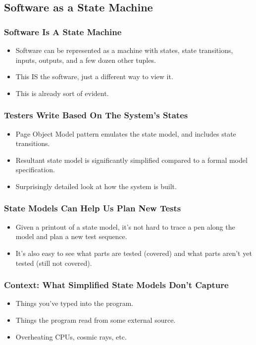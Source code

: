 \subsection{Software as a State Machine}
\begin{frame}
  \frametitle{Software Is A State Machine}
  \begin{itemize}
    \item Software can be represented as a machine with states, state transitions, inputs, outputs, and a few dozen other tuples.
    \item This IS the software, just a different way to view it.
    \item This is already sort of evident.
  \end{itemize}
\end{frame}

\begin{frame}
  \frametitle{Testers Write Based On The System's States}
  \begin{itemize}
    \item Page Object Model pattern emulates the state model, and includes state transitions.
    \item Resultant state model is significantly simplified compared to a formal model specification.
    \item Surprisingly detailed look at how the system is built.
  \end{itemize}
\end{frame}

\begin{frame}
  \frametitle{State Models Can Help Us Plan New Tests}
  \begin{itemize}
    \item Given a printout of a state model, it's not hard to trace a pen along the model and plan a new test sequence.
    \item It's also easy to see what parts are tested (covered) and what parts aren't yet tested (still not covered).
  \end{itemize}
\end{frame}

\begin{frame}
  \frametitle{Context: What Simplified State Models Don't Capture}
  \begin{itemize}
    \item Things you've typed into the program.
    \item Things the program read from some external source.
    \item Overheating CPUs, cosmic rays, etc.
  \end{itemize}
\end{frame}

